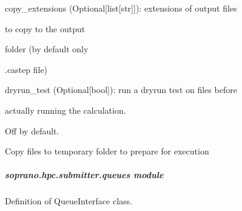 \documentclass[letterpaper,10pt,english]{sphinxmanual}
\begin{document}
\begin{fulllineitems}
\begin{fulllineitems}
\begin{DUlineblock}{0em}
\begin{DUlineblock}{\DUlineblockindent}
\item[] copy\_extensions (Optional{[}list{[}str{]}{]}): extensions of output files
\item[]
\begin{DUlineblock}{\DUlineblockindent}
\item[] to copy to the output
\item[] folder (by default only
\item[] .castep file)
\end{DUlineblock}
\item[] dryrun\_test (Optional{[}bool{]}): run a dryrun test on files before
\item[]
\begin{DUlineblock}{\DUlineblockindent}
\item[] actually running the calculation.
\item[] Off by default.
\end{DUlineblock}
\end{DUlineblock}
\end{DUlineblock}

\end{fulllineitems}


\begin{fulllineitems}
\label{doctree/soprano.hpc.submitter.castep:soprano.hpc.submitter.castep.CastepSubmitter.setup_job}
Copy files to temporary folder to prepare for execution

\end{fulllineitems}


\begin{fulllineitems}
\label{doctree/soprano.hpc.submitter.castep:soprano.hpc.submitter.castep.CastepSubmitter.start_run}
\end{fulllineitems}


\end{fulllineitems}



\subparagraph{soprano.hpc.submitter.queues module}
\label{doctree/soprano.hpc.submitter.queues::doc}\label{doctree/soprano.hpc.submitter.queues:module-soprano.hpc.submitter.queues}\label{doctree/soprano.hpc.submitter.queues:soprano-hpc-submitter-queues-module}
Definition of QueueInterface class.
\end{document}
